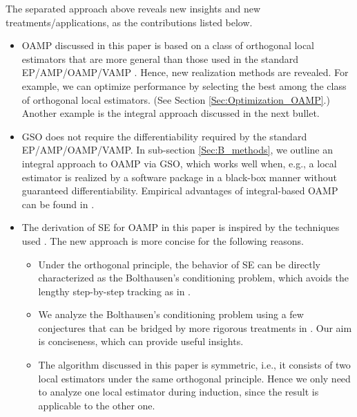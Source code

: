 \documentclass[journal]{IEEEtran}
\begin{document}
{ The separated approach above reveals new insights and new treatments/applications, as the contributions listed below. 
\begin{itemize}
    \item OAMP discussed in this paper is based on a class of orthogonal local estimators that are more general than those used in the standard EP/AMP/OAMP/VAMP \cite{ Donoho2009, Ma2016, Rangan2016, Takeuchi2017, Bayati2011, Takeuchi2019}. Hence, new realization methods are revealed. For example, we can optimize performance by selecting the best among the class of orthogonal local estimators. (See Section \ref{Sec:Optimization_OAMP}.) Another example is the integral approach discussed in the next bullet.
\item GSO does not require the differentiability required by the standard EP/AMP/OAMP/VAMP. In sub-section \ref{Sec:B_methods}, we outline an integral approach to OAMP via GSO, which works well when, e.g., a local estimator is realized by a software package in a black-box manner without guaranteed differentiability. Empirical advantages of integral-based OAMP can be found in \cite{Yiyao_integral}.
\item  The derivation of SE for OAMP in this paper is inspired by the techniques used \cite{Rangan2016, Takeuchi2017, Bayati2011, Takeuchi2019}. The new approach is more concise for the following reasons. 
\begin{itemize}
    \item Under the orthogonal principle, the behavior of SE can be directly characterized as the Bolthausen’s conditioning problem, which avoids the lengthy step-by-step tracking as in \cite{Rangan2016, Takeuchi2017, Bayati2011}. %
\item  We analyze the Bolthausen’s conditioning problem using a few conjectures that can be bridged by more rigorous treatments in  \cite{Rangan2016, Takeuchi2017,  Takeuchi2019}. Our aim is conciseness, which can provide useful insights.
\item The algorithm discussed in this paper is symmetric, i.e., it consists of two local estimators under the same orthogonal principle. Hence we only need to analyze one local estimator during induction, since the result is applicable to the other one. %
\end{itemize}
 \end{itemize}
 
}
\end{document}

